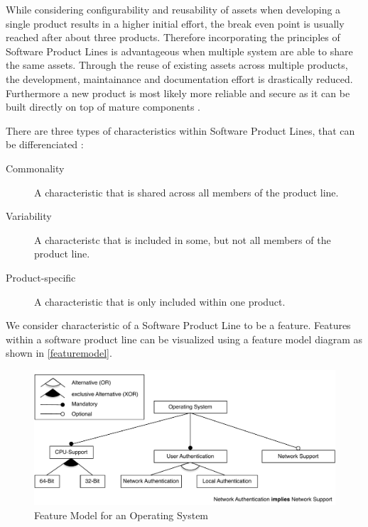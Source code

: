 \documentclass[a4paper]{article}
\begin{document}
While considering configurability and reusability of assets when developing a single product results in a higher initial effort, the break even point is usually reached after about three products. Therefore incorporating the principles of Software Product Lines is advantageous when multiple system are able to share the same assets. Through the reuse of existing assets across multiple products, the development, maintainance and documentation effort is drastically reduced. Furthermore a new product is most likely more reliable and secure as it can be built directly on top of mature components  \cite[p.4f]{spl-in-action}.

There are three types of characteristics within Software Product Lines, that can be differenciated \cite[p.8]{spl-in-action}:
\begin{description}
\item[Commonality]  A characteristic that is shared across all members of the product line.
\item[Variability]  A characteristc that is included in some, but not all members of the product line.
\item[Product-specific]  A characteristic that is only included within one product. 
\end{description}

We consider characteristic of a Software Product Line to be a feature. Features within a software product line can be visualized using a feature model diagram as shown in \autoref{featuremodel}. 

\begin{figure}[h] 
  \centering
  \begin{minipage}[b]{1\textwidth} 
    \caption[Feature Model]{Feature Model for an Operating System}\label{featuremodel}
    \includegraphics[width=1\textwidth]{img/featuremodel.pdf}
  \end{minipage}
\end{figure}
\end{document}
